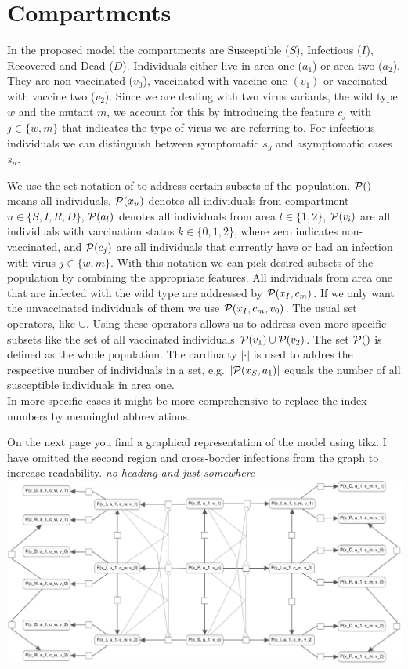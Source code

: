 \section{Compartments}

In the proposed model the compartments are Susceptible ($S$), Infectious ($I$), Recovered and Dead ($D$). Individuals either live in area one ($a_1$) or area two ($a_2$). They are non-vaccinated ($v_0$), vaccinated with vaccine one $(v_1)$ or vaccinated with vaccine two ($v_2$). Since we are dealing with two virus variants, the wild type $w$ and the mutant $m$, we account for this by introducing the feature $c_j$ with $j \in \{w,m\}$ that indicates the type of virus we are referring to. For infectious individuals we can distinguish between symptomatic $s_y$ and asymptomatic cases $s_n$.
 
We use the set notation of \cite{Waites.2021} to address certain subsets of the population. $\mathcal{P}()$ means all individuals. $\mathcal{P}(x_u)$ denotes all individuals from compartment $u \in \{S, I, R, D \}$, $\mathcal{P}(a_l)$ denotes all individuals from area $l \in \{1,2\}$, $\mathcal{P}(v_i)$ are all individuals with vaccination status $k \in \{0,1,2\}$, where zero indicates non-vaccinated, and $\mathcal{P}(c_j)$ are all individuals that currently have or had an infection with virus $j \in \{w,m\}$. With this notation we can pick desired subsets of the population by combining the appropriate features. All individuals from area one that are infected with the wild type are addressed by $\mathcal{P}(x_I, c_m)$. If we only want the unvaccinated individuals of them we use $\mathcal{P}(x_I, c_m, v_0)$. The usual set operators, like $\cup$. Using these operators allows us to address even more specific subsets like the set of all vaccinated individuals $\mathcal{P}(v_1) \cup \mathcal{P}(v_2)$. The set $\mathcal{P}()$ is defined as the whole population. The cardinalty $|\cdot|$ is used to addres the respective number of individuals in a set, e.g. $|\mathcal{P}(x_S, a_1)|$ equals the number of all susceptible individuals in area one.\\

In more specific cases it might be more comprehensive to replace the index numbers by meaningful abbreviations.


On the next page you find a graphical representation of the model using tikz. I have omitted the second region and cross-border infections from the graph to increase readability.  
\textit{no heading and just somewhere}
\includegraphics[scale=0.15]{images/vaccination.png}

